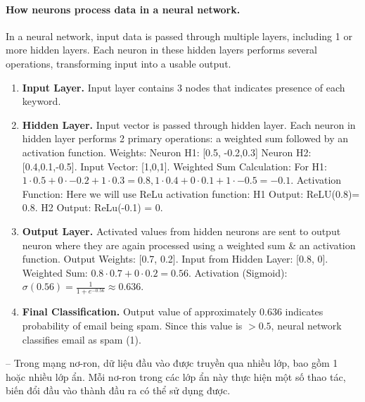 \documentclass{article}
\begin{document}
\paragraph*{How neurons process data in a neural network.} In a neural network, input data is passed through multiple layers, including 1 or more hidden layers. Each neuron in these hidden layers performs several operations, transforming input into a usable output.
\begin{enumerate}
    \item {\bf Input Layer.} Input layer contains 3 nodes that indicates presence of each keyword.
    \item {\bf Hidden Layer.} Input vector is passed through hidden layer. Each neuron in hidden layer performs 2 primary operations: a weighted sum followed by an activation function. Weights: Neuron H1: [0.5, -0.2,0.3] Neuron H2: [0.4,0.1,-0.5]. Input Vector: [1,0,1]. Weighted Sum Calculation: For H1: $1\cdot0.5 + 0\cdot-0.2 + 1\cdot0.3 = 0.
    8,1\cdot0.4 + 0\cdot0.1 + 1\cdot-0.5 = -0.1$. Activation Function: Here we will use ReLu activation function: H1 Output: ReLU(0.8)= 0.8. H2 Output: ReLu(-0.1) = 0.
    \item {\bf Output Layer.} Activated values from hidden neurons are sent to output neuron where they are again processed using a weighted sum \& an activation function. Output Weights: [0.7, 0.2]. Input from Hidden Layer: [0.8, 0]. Weighted Sum: $0.8\cdot0.7 + 0\cdot0.2 = 0.56$. Activation (Sigmoid): $\sigma(0.56) = \frac{1}{1 + e^{-0.56}}\approx0.636$.
    \item {\bf Final Classification.} Output value of approximately 0.636 indicates probability of email being spam. Since this value is $> 0.5$, neural network classifies email as spam (1).
\end{enumerate}
-- Trong mạng nơ-ron, dữ liệu đầu vào được truyền qua nhiều lớp, bao gồm 1 hoặc nhiều lớp ẩn. Mỗi nơ-ron trong các lớp ẩn này thực hiện một số thao tác, biến đổi đầu vào thành đầu ra có thể sử dụng được.
\end{document}
